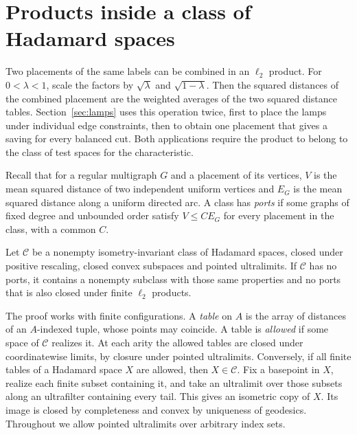\section{Products inside a class of Hadamard spaces}\label{sec:product}

Two placements of the same labels can be combined in an $\ell_2$ product.
For $0<\lambda<1$, scale the factors by $\sqrt{\lambda}$ and $\sqrt{1-\lambda}$. Then
the squared distances of the combined placement are the weighted averages
of the two squared distance tables. Section~\ref{sec:lamps} uses this
operation twice, first to place the lamps under individual edge constraints,
then to obtain one placement that gives a saving for every balanced cut.
Both applications require the product to belong to the class of test
spaces for the characteristic.

Recall that for a regular multigraph $G$ and a placement of its vertices,
$V$ is the mean squared distance of two independent uniform vertices and
$E_G$ is the mean squared distance along a uniform directed arc. A class
has \emph{ports} if some graphs of fixed degree and unbounded order
satisfy $V\le C E_G$ for every placement in the class, with a common $C$.

\begin{theorem}\label{prod:main}
Let $\mathcal C$ be a nonempty isometry-invariant class of Hadamard spaces,
closed under positive rescaling, closed convex subspaces and pointed
ultralimits. If $\mathcal C$ has no ports, it contains a nonempty subclass
with those same properties and no ports that is also closed under finite
$\ell_2$ products.
\end{theorem}

The proof works with finite configurations. A \emph{table} on $A$ is
the array of distances of an $A$-indexed tuple, whose points may coincide.
A table is \emph{allowed} if some space of $\mathcal C$ realizes it.
At each arity the allowed tables are closed under coordinatewise limits,
by closure under pointed ultralimits. Conversely, if all finite tables
of a Hadamard space $X$ are allowed, then $X\in\mathcal C$. Fix a
basepoint in $X$, realize each finite subset containing it, and take an
ultralimit over those subsets along an ultrafilter containing every tail.
This gives an isometric copy of $X$. Its image is closed by completeness
and convex by uniqueness of geodesics. Throughout we allow pointed
ultralimits over arbitrary index sets.

